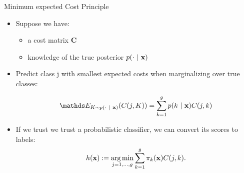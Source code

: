 \documentclass[11pt,compress,t,notes=noshow, xcolor=table]{beamer}
\begin{document}
\begin{vbframe}{Minimum expected Cost Principle}


		\begin{itemize}
		
			\item Suppose we have:
            \begin{itemize}
                \item a cost matrix $\mathbf{C}$
                
                \item knowledge of the true posterior $p(\cdot ~|~ \mathbf{x})$
            \end{itemize}

                

			\item Predict class j with smallest expected costs when marginalizing over true classes:
	
			$$ 	\E_{K \sim p(\cdot ~|~ \xv)}( C(j,K) ) = \sumkg p(k ~|~ \xv) C(j,k)	$$
	
		\end{itemize}

    \begin{itemize}
        \item If we trust we trust a probabilistic classifier, we can convert its scores to labels:
		$$  h(\mathbf{x}) := \mathop{\mathrm{arg\,min}}\limits_{j=1,\ldots,g} \sum\limits_{k=1}^g 	\pi_{k}(\mathbf{x}) C(j,k). $$
 
        

\end{itemize}
\end{vbframe}
\end{document}
